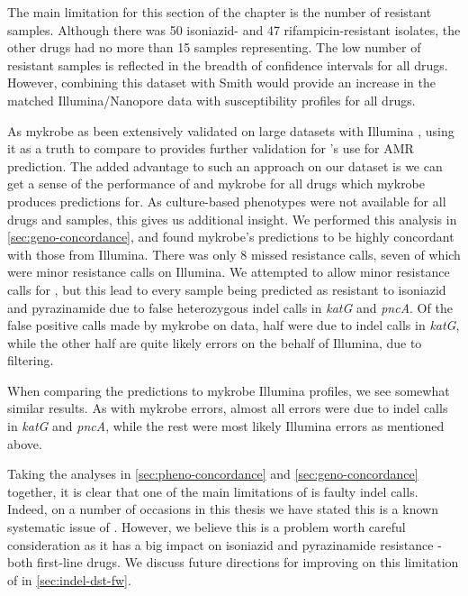 The main limitation for this section of the chapter is the number of resistant samples. Although there was 50 isoniazid- and 47 rifampicin-resistant isolates, the other drugs had no more than 15 samples representing. The low number of resistant samples is reflected in the breadth of confidence intervals for all drugs. However, combining this dataset with Smith \etal{} \cite{smith2020} would provide an increase in the matched Illumina/Nanopore data with susceptibility profiles for all drugs.

\noindent
As mykrobe as been extensively validated on large datasets with Illumina \cite{bradley2015,hunt2019}, using it as a truth to compare \ont{} to provides further validation for \ont{}'s use for AMR prediction. The added advantage to such an approach on our dataset is we can get a sense of the performance of \drprg{} and mykrobe \ont{} for all drugs which mykrobe produces predictions for. As culture-based phenotypes were not available for all drugs and samples, this gives us additional insight. We performed this analysis in \autoref{sec:geno-concordance}, and found mykrobe's \ont{} predictions to be highly concordant with those from Illumina. There was only 8 missed resistance calls, seven of which were minor resistance calls on Illumina. We attempted to allow minor resistance calls for \ont{}, but this lead to every sample being predicted as resistant to isoniazid and pyrazinamide due to false heterozygous indel calls in \textit{katG} and \textit{pncA}. Of the false positive calls made by mykrobe on \ont{} data, half were due to indel calls in \textit{katG}, while the other half are quite likely errors on the behalf of Illumina, due to filtering.

When comparing the \drprg{} predictions to mykrobe Illumina profiles, we see somewhat similar results. As with mykrobe \ont{} errors, almost all \drprg{} errors were due to indel calls in \textit{katG} and \textit{pncA}, while the rest were most likely Illumina errors as mentioned above. 

Taking the analyses in \autoref{sec:pheno-concordance} and \autoref{sec:geno-concordance} together, it is clear that one of the main limitations of \drprg{} is faulty indel calls. Indeed, on a number of occasions in this thesis we have stated this is a known systematic issue of \ont{} \cite{watson2019}. However, we believe this is a problem worth careful consideration as it has a big impact on isoniazid and pyrazinamide resistance - both first-line \mtb{} drugs. We discuss future directions for improving on this limitation of \drprg{} in \autoref{sec:indel-dst-fw}.


